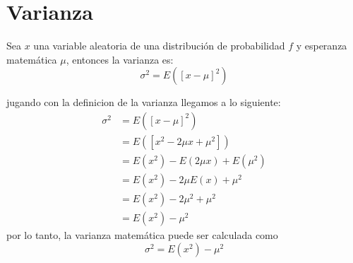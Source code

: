 \section{Varianza}
\begin{definicion}
    Sea $x$ una variable aleatoria de una distribución de probabilidad $f$ y esperanza matemática $\mu$, entonces la varianza es:
    \begin{equation}
        \sigma^2 = E(\left[x-\mu\right]^2)
    \end{equation}
\end{definicion}
jugando con la definicion de la varianza llegamos a lo siguiente:
\begin{align*}
    \sigma^2 & = E(\left[x-\mu\right]^2)          \\
             & = E(\left[x^2-2\mu x+\mu^2\right]) \\
             & = E(x^2) - E(2\mu x ) + E(\mu^2)   \\
             & = E(x^2) - 2\mu E(x) + \mu^2       \\
             & = E(x^2) - 2 \mu^2 + \mu^2         \\
             & = E(x^2) - \mu^2
\end{align*}
por lo tanto, la varianza matemática puede ser calculada como
\begin{equation}
    \sigma^2 = E(x^2) - \mu^2
\end{equation}
